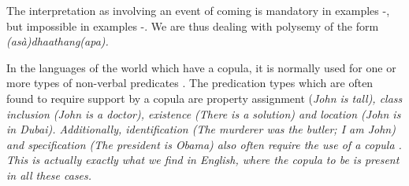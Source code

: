 \documentclass[a4paper,12pt]{article}
\begin{document}
 

% 
% 
 


 

The interpretation as involving an event of coming is mandatory in examples -, but impossible in examples -. We are thus dealing with polysemy of the form \em (asà)dhaathang(apa)\em.
 
In the languages of the world which have a copula, it is normally used for one or more types of non-verbal predicates \citep{Stassen1997}. The predication types which are often found to require support by a copula are property assignment (\em John is tall\em), class inclusion (\em John is a doctor\em), existence (\em There is a solution\em) and location (\em John is in Dubai\em). Additionally, identification (\em The murderer was the butler; I am John\em) and specification (\em The president is Obama\em) also often require the use of a copula \citep{Hengeveld1992nvpttd}. This is actually exactly what we find in English, where the copula \em to be \em is present in all these cases.
\end{document}
